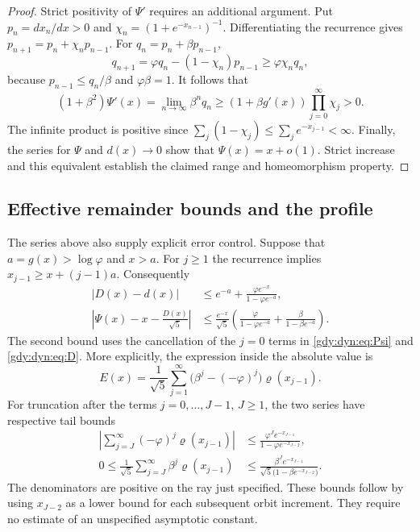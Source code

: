 \documentclass[11pt]{article}
\numberwithin{equation}{section}
\theoremstyle{definition}
\theoremstyle{remark}
\begin{document}
\begin{proof}
Strict positivity of $\Psi'$ requires an additional argument. Put
$p_n=dx_n/dx>0$ and
$\chi_n=(1+e^{-x_{n-1}})^{-1}$. Differentiating the recurrence gives
$p_{n+1}=p_n+\chi_np_{n-1}$. For $q_n=p_n+\beta p_{n-1}$,
\[
 q_{n+1}=\varphi q_n-(1-\chi_n)p_{n-1}
          \ge\varphi \chi_nq_n,
\]
because $p_{n-1}\le q_n/\beta$ and $\varphi\beta=1$. It follows that
\[
 (1+\beta^2)\Psi'(x)
 =\lim_{n\to\infty}\beta^nq_n
 \ge (1+\beta g'(x))\prod_{j=0}^{\infty}\chi_j>0.
\]
The infinite product is positive since
$\sum_j(1-\chi_j)\le\sum_j e^{-x_{j-1}}<\infty$.
Finally, the series for $\Psi$ and $d(x)\to0$ show that
$\Psi(x)=x+o(1)$. Strict increase and this equivalent establish the
claimed range and homeomorphism property.
\end{proof}

\subsection{Effective remainder bounds and the profile}
\label{gdy:dyn:sub:profile}

The series above also supply explicit error control. Suppose that
$a=g(x)>\log\varphi$ and $x>a$. For $j\ge1$ the recurrence implies
$x_{j-1}\ge x+(j-1)a$. Consequently
\begin{align}
 |D(x)-d(x)|
 &\le e^{-a}+\frac{\varphi e^{-x}}{1-\varphi e^{-a}},
 \label{gdy:dyn:eq:Derror}\\
 \left|\Psi(x)-x-\frac{D(x)}{\sqrt5}\right|
 &\le\frac{e^{-x}}{\sqrt5}
  \left(\frac{\varphi}{1-\varphi e^{-a}}
       +\frac{\beta}{1-\beta e^{-a}}\right).
 \label{gdy:dyn:eq:Psisharp}
\end{align}
The second bound uses the cancellation of the $j=0$ terms in
\eqref{gdy:dyn:eq:Psi} and \eqref{gdy:dyn:eq:D}. More explicitly, the expression
inside the absolute value is
\begin{equation}\label{gdy:dyn:eq:Eseries}
 E(x)=\frac1{\sqrt5}\sum_{j=1}^{\infty}
          \bigl(\beta^j-(-\varphi)^j\bigr)\varrho(x_{j-1}).
\end{equation}
For truncation after the terms $j=0,\ldots,J-1$, $J\ge1$, the two
series have respective tail bounds
\begin{align}
 \left|\sum_{j=J}^{\infty}(-\varphi)^j\varrho(x_{j-1})\right|
 &\le\frac{\varphi^J e^{-x_{J-1}}}
               {1-\varphi e^{-x_{J-2}}},\label{gdy:dyn:eq:Dtail}\\
 0\le\frac1{\sqrt5}\sum_{j=J}^{\infty}\beta^j\varrho(x_{j-1})
 &\le\frac{\beta^J e^{-x_{J-1}}}
       {\sqrt5\bigl(1-\beta e^{-x_{J-2}}\bigr)}.
       \label{gdy:dyn:eq:Psitail}
\end{align}
The denominators are positive on the ray just specified. These bounds
follow by using $x_{J-2}$ as a lower bound for each subsequent orbit
increment. They require no estimate of an unspecified asymptotic
constant.
\end{document}
